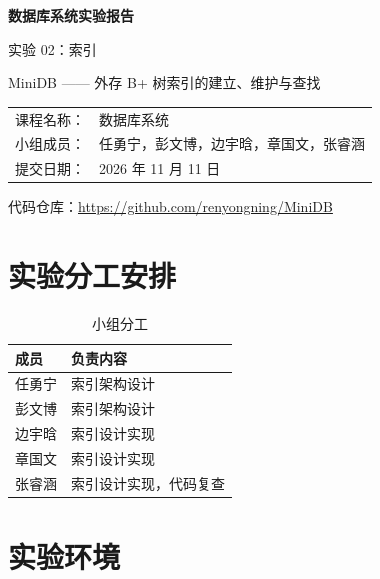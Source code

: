 \documentclass[11pt,a4paper]{ctexart}
\begin{document}
\begin{titlepage}
  \centering
  \vspace*{3cm}
  {\Huge\bfseries 数据库系统实验报告\par}
  \vspace{1cm}
  {\LARGE 实验 02：索引\par}
  \vspace{0.6cm}
  {\large MiniDB —— 外存 B+ 树索引的建立、维护与查找\par}
  \vspace{3cm}
  \begin{tabular}{rl}
    课程名称： & 数据库系统 \\[4pt]
    小组成员： & 任勇宁，彭文博，边宇晗，章国文，张睿涵 \\[4pt]
    提交日期： & 2026 年 11 月 11 日 \\
  \end{tabular}
  \vfill
  {\small 代码仓库：\url{https://github.com/renyongning/MiniDB}\par}
\end{titlepage}

\tableofcontents
\newpage

\section{实验分工安排}

\begin{table}[H]
  \centering
  \caption{小组分工}
  \begin{tabularx}{\textwidth}{l X}
    \toprule
    成员 & 负责内容 \\
    \midrule
    任勇宁 & 索引架构设计 \\
    彭文博 & 索引架构设计 \\
    边宇晗 & 索引设计实现 \\
    章国文 & 索引设计实现 \\
    张睿涵 & 索引设计实现，代码复查 \\
    \bottomrule
  \end{tabularx}
\end{table}

\section{实验环境}
\end{document}
